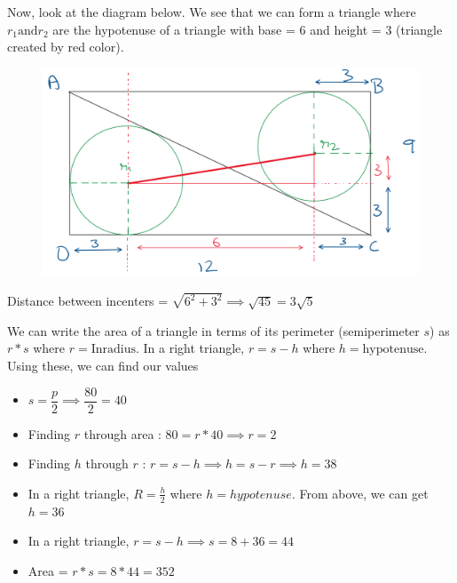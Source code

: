 Now, look at the diagram below. We see that we can form a triangle where $r_1 \text{and} r_2$ are the hypotenuse of a triangle with base = 6 and height = 3 (triangle created by red color). 

\begin{figure}[h!]
    \centering
    \includegraphics[width=0.7\linewidth]{Quant//Geometry//Images//Triangles/rodha_triangle_5_q2_2.png}
\end{figure}

Distance between incenters = $\sqrt{6^2 + 3^2} \implies \sqrt{45} = 3 \sqrt{5}$

\newpage


We can write the area of a triangle in terms of its perimeter (semiperimeter $s$) as $r * s$ where $r = \text{Inradius}$. In a right triangle, $r = s - h$ where $h = \text{hypotenuse}$. Using these, we can find our values
\begin{itemize}
    \item $s = \dfrac{p}{2} \implies \dfrac{80}{2} = 40$
    \item Finding $r$ through area : $80 = r * 40 \implies r = 2$
    \item Finding $h$ through $r$ : $r = s - h \implies h = s - r \implies h = 38$
\end{itemize}


\begin{itemize}
    \item In a right triangle, $R = \frac{h}{2}$ where $h = hypotenuse$. From above, we can get $h = 36$

    \item In a right triangle, $r = s - h \implies s = 8 + 36 = 44$

    \item Area = $r * s = 8 * 44 = 352$
\end{itemize}

